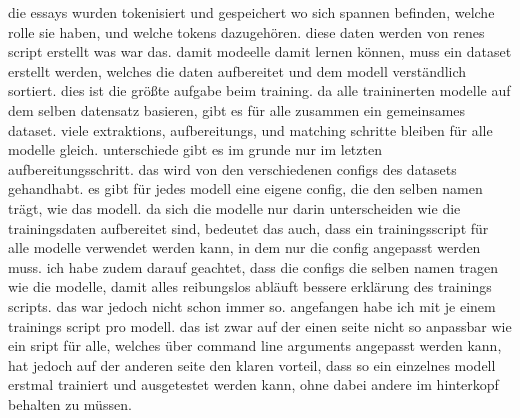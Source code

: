\documentclass[12]{article}
\theoremstyle{mytheoremstyle}
\theoremstyle{mytheoremstyle}
\theoremstyle{myproblemstyle}
\begin{document}
  die essays wurden tokenisiert und gespeichert wo sich spannen befinden, welche rolle sie haben, und welche tokens dazugehören. diese daten werden von renes script erstellt was war das. damit modeelle damit lernen können, muss ein dataset erstellt werden, welches die daten aufbereitet und dem modell verständlich sortiert. dies ist die größte aufgabe beim training. da alle traininerten modelle auf dem selben datensatz basieren, gibt es für alle zusammen ein gemeinsames dataset. viele extraktions, aufbereitungs, und matching schritte bleiben für alle modelle gleich. unterschiede gibt es im grunde nur im letzten aufbereitungsschritt. das wird von den verschiedenen configs des datasets gehandhabt. es gibt für jedes modell eine eigene config, die den selben namen trägt, wie das modell. da sich die modelle nur darin unterscheiden wie die trainingsdaten aufbereitet sind, bedeutet das auch, dass ein trainingsscript für alle modelle verwendet werden kann, in dem nur die config angepasst werden muss. ich habe zudem darauf geachtet, dass die configs die selben namen tragen wie die modelle, damit alles reibungslos abläuft bessere erklärung des trainings scripts. das war jedoch nicht schon immer so. angefangen habe ich mit je einem trainings script pro modell. das ist zwar auf der einen seite nicht so anpassbar wie ein sript für alle, welches über command line arguments angepasst werden kann, hat jedoch auf der anderen seite den klaren vorteil, dass so ein einzelnes modell erstmal trainiert und ausgetestet werden kann, ohne dabei andere im hinterkopf behalten zu müssen. 
\end{document}
